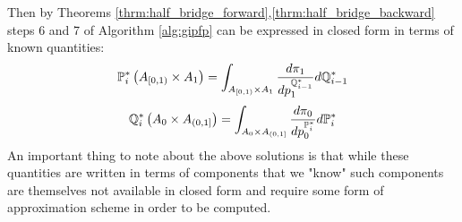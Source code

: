 \documentclass[a4paper,12pt,twoside,openright]{report}
\theoremstyle{definition}
\begin{document}
Then by Theorems \ref{thrm:half_bridge_forward},\ref{thrm:half_bridge_backward} steps 6 and 7 of Algorithm \ref{alg:gipfp} can be expressed in closed form in terms of known quantities:
\begin{align}
    {{\mathbb{P}}}^{*}_i\left( A_{[0,1)} \times A_1\right) =  \int_{ A_{[0,1)} \times A_1}  \frac{d \pi_1}{ d p_1^{{\mathbb{Q}}^{*}_{i-1}}} d{\mathbb{Q}}^{*}_{i-1}
\end{align}
\begin{align}
    {{\mathbb{Q}}}^{*}_i\left(A_0 \times A_{(0,1]}\right) =  \int_{A_0\times A_{(0,1]}} \frac{d \pi_0}{ dp_0^{{\mathbb{P}}^{*}_i}} d{\mathbb{P}}^{*}_i
\end{align}
An important thing to note about the above solutions is that while these quantities are written in terms of components that we "know" such components are themselves not available in closed form and require some form of approximation scheme in order to be computed.
\end{document}
